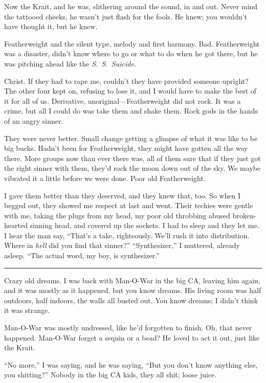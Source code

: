Now the Krait, and he was, slithering around the sound, in and out. Never mind the tattooed cheeks, he wasn't just flash for the fools. He knew; you wouldn't have thought it, but he knew.

Featherweight and the silent type, melody and first harmony. Bad. Featherweight was a disaster, didn't know where to go or what to do when he got there, but he was pitching ahead like the \textit{S.\ S.\ Suicide}.

Christ. If they had to rape me, couldn't they have provided someone upright? The other four kept on, refusing to lose it, and I would have to make the best of it for all of us. Derivative, unoriginal—Featherweight did not rock. It was a crime, but all I could do was take them and shake them. Rock gods in the hands of an angry sinner.

They were never better. Small change getting a glimpse of what it was like to be big bucks. Hadn't been for Featherweight, they might have gotten all the way there. More groups now than ever there was, all of them sure that if they just got the right sinner with them, they'd rock the moon down out of the sky.
We maybe vibrated it a little before we were done. Poor old Featherweight.

I gave them better than they deserved, and they knew that, too. So when I begged out, they showed me respect at last and went. Their techies were gentle with me, taking the plugs from my head, my poor old throbbing abused broken-hearted sinning head, and covered up the sockets. I had to sleep and they let me. I hear the man say, ``That's a take, righteously. We'll rush it into distribution. Where in \textit{hell} did you find that sinner?''
``Synthesizer,'' I muttered, already asleep. ``The actual word, my boy, is synthesizer.''

\fancybreak{* * *}

Crazy old dreams. I was back with Man-O-War in the big CA, leaving him again, and it was mostly as it happened, but you know dreams. His living room was half outdoors, half indoors, the walls all busted out. You know dreams; I didn't think it was strange.

Man-O-War was mostly undressed, like he'd forgotten to finish. Oh, that never happened. Man-O-War forget a sequin or a bead? He loved to act it out, just like the Krait.

``No more,'' I was saying, and he was saying, ``But you don't know anything else, you shitting?'' Nobody in the big CA kids, they all shit; loose juice.

